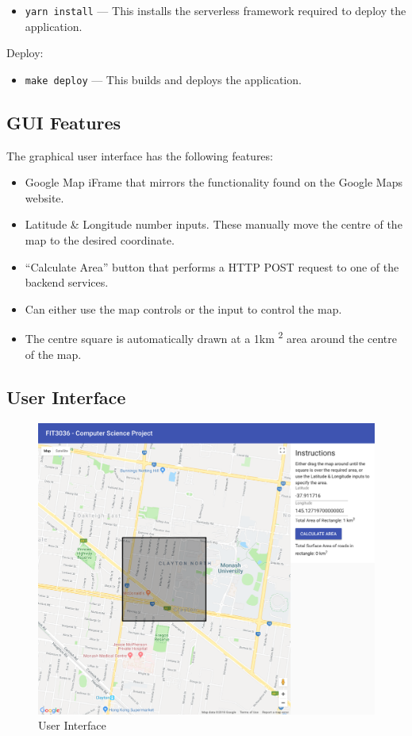 \documentclass[a4paper,11pt]{article}
\def\code#1{\texttt{#1}}
\begin{document}
\begin{itemize}
  \item \code{yarn install} --- This installs the serverless framework required
    to deploy the application.
\end{itemize}

\noindent{}
Deploy:

\begin{itemize}
  \item \code{make deploy} --- This builds and deploys the application.
\end{itemize}

\subsection{GUI Features}

The graphical user interface has the following features:

\begin{itemize}
  \item Google Map iFrame that mirrors the functionality found on the Google
    Maps website.
  \item Latitude \& Longitude number inputs. These manually move the centre of the map
    to the desired coordinate.
  \item ``Calculate Area'' button that performs a HTTP POST request to one of the
    backend services.
  \item Can either use the map controls or the input to control the map.
  \item The centre square is automatically drawn at a 1km \textsuperscript{2}
    area around the centre of  the map.
\end{itemize}

\subsection{User Interface}

\begin{figure}[H]
  \includegraphics[width=\textwidth]{ui}
  \caption{User Interface}\label{fig:ui}
\end{figure}
\end{document}
